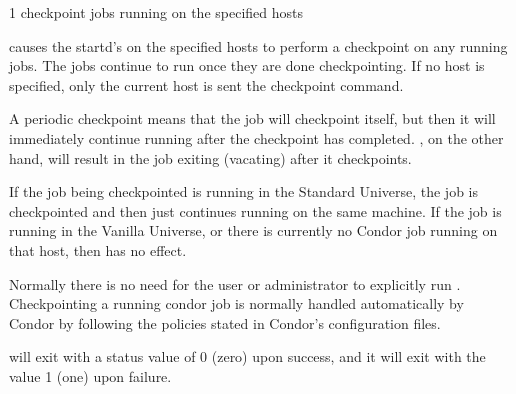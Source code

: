 \begin{ManPage}{\label{man-condor-checkpoint}}{1}
{checkpoint jobs running on the specified hosts}
\Synopsis {}
\ToolArgs


\Description
{} causes the startd's on the specified hosts to perform a 
checkpoint on any running jobs. The jobs continue to run once
they are done checkpointing. If no host is specified, only the current host is sent
the checkpoint command.

A periodic checkpoint means that the job will checkpoint itself, but then it will immediately continue running
after the checkpoint has completed. , on the other hand, will result in the job exiting (vacating) after it
checkpoints. 

If the job being checkpointed is running in the Standard Universe, the job is checkpointed and then just continues running
on the same machine. If the job is running in the Vanilla Universe, or there is currently no Condor job
running on that host, then  has no effect. 

Normally there is no need for the user or administrator to explicitly run . Checkpointing a running condor
job is normally handled automatically by Condor by following the policies stated in Condor's configuration files. 

\begin{Options}
	\ToolArgsDesc
\end{Options}

\ExitStatus

 will exit with a status value of 0 (zero) upon success,
and it will exit with the value 1 (one) upon failure.

\end{ManPage}
